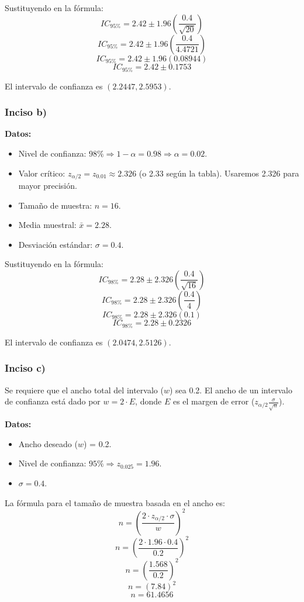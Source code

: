 \documentclass[12pt]{article}
\begin{document}
Sustituyendo en la fórmula:
$$ IC_{95\%} = 2.42 \pm 1.96 \left( \frac{0.4}{\sqrt{20}} \right) $$
$$ IC_{95\%} = 2.42 \pm 1.96 \left( \frac{0.4}{4.4721} \right) $$
$$ IC_{95\%} = 2.42 \pm 1.96 (0.08944) $$
$$ IC_{95\%} = 2.42 \pm 0.1753 $$

El intervalo de confianza es $(2.2447, 2.5953)$.

\subsubsection{Inciso b)}
\textbf{Datos:}
\begin{itemize}
    \item Nivel de confianza: $98\% \Rightarrow 1 - \alpha = 0.98 \Rightarrow \alpha = 0.02$.
    \item Valor crítico: $z_{\alpha/2} = z_{0.01} \approx 2.326$ (o 2.33 según la tabla). Usaremos 2.326 para mayor precisión.
    \item Tamaño de muestra: $n = 16$.
    \item Media muestral: $\bar{x} = 2.28$.
    \item Desviación estándar: $\sigma = 0.4$.
\end{itemize}

Sustituyendo en la fórmula:
$$ IC_{98\%} = 2.28 \pm 2.326 \left( \frac{0.4}{\sqrt{16}} \right) $$
$$ IC_{98\%} = 2.28 \pm 2.326 \left( \frac{0.4}{4} \right) $$
$$ IC_{98\%} = 2.28 \pm 2.326 (0.1) $$
$$ IC_{98\%} = 2.28 \pm 0.2326 $$

El intervalo de confianza es $(2.0474, 2.5126)$.

\subsubsection{Inciso c)}
Se requiere que el ancho total del intervalo ($w$) sea 0.2. El ancho de un intervalo de confianza está dado por $w = 2 \cdot E$, donde $E$ es el margen de error ($z_{\alpha/2} \frac{\sigma}{\sqrt{n}}$).

\textbf{Datos:}
\begin{itemize}
    \item Ancho deseado ($w$) = 0.2.
    \item Nivel de confianza: $95\% \Rightarrow z_{0.025} = 1.96$.
    \item $\sigma = 0.4$.
\end{itemize}

La fórmula para el tamaño de muestra basada en el ancho es:
$$ n = \left( \frac{2 \cdot z_{\alpha/2} \cdot \sigma}{w} \right)^2 $$
$$ n = \left( \frac{2 \cdot 1.96 \cdot 0.4}{0.2} \right)^2 $$
$$ n = \left( \frac{1.568}{0.2} \right)^2 $$
$$ n = (7.84)^2 $$
$$ n = 61.4656 $$
\end{document}
